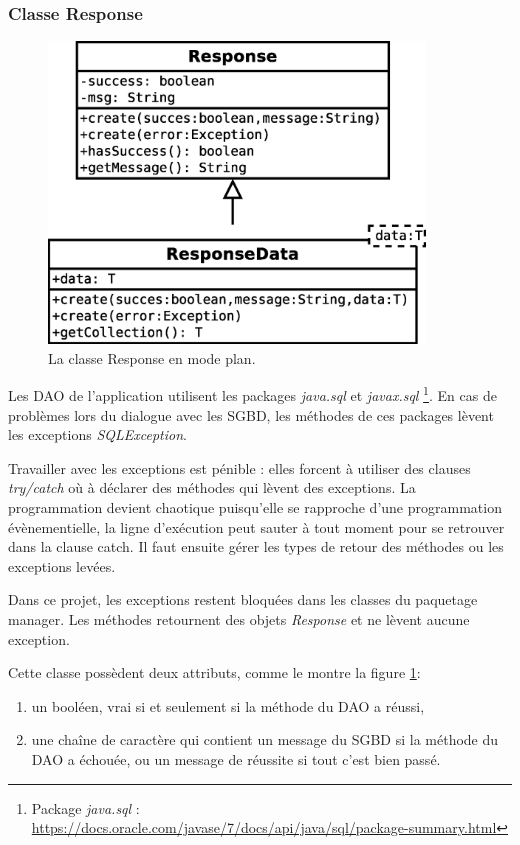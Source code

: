 \subsubsection{Classe Response}
\begin{figure}[!h]
  \centering
  \includegraphics[width=10cm]{images/response.eps}
  \caption{La classe Response en mode plan.}
  \label{uml_classe_response}
\end{figure}

Les DAO de l'application utilisent les packages \textit{java.sql} et \textit{javax.sql}
\footnote{\label{paquetages_sql}Package \textit{java.sql} : \url{https://docs.oracle.com/javase/7/docs/api/java/sql/package-summary.html}}.
En cas de problèmes lors du dialogue avec les SGBD, les méthodes de ces packages lèvent les exceptions \textit{SQLException}.

Travailler avec les exceptions est pénible : elles forcent à utiliser des clauses \textit{try/catch} où à déclarer des méthodes qui lèvent des exceptions.
La programmation devient chaotique puisqu'elle se rapproche d'une programmation évènementielle, la ligne d'exécution peut sauter à tout moment pour se retrouver dans la clause catch.
Il faut ensuite gérer les types de retour des méthodes ou les exceptions levées.

Dans ce projet, les exceptions restent bloquées dans les classes du paquetage manager.
Les méthodes retournent des objets \textit{Response} et ne lèvent aucune exception.

Cette classe possèdent deux attributs, comme le montre la figure \ref{uml_classe_response}:
\begin{enumerate}
\item un booléen, vrai si et seulement si la méthode du DAO a réussi,
\item une chaîne de caractère qui contient un message du SGBD si la méthode du DAO a échouée, ou un message de réussite si tout c'est bien passé.
\end{enumerate}

